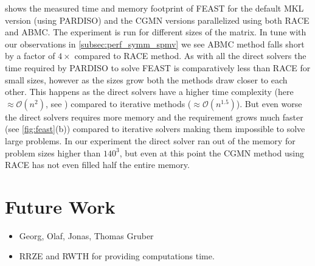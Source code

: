  shows the measured time and memory footprint of FEAST for 
the default MKL version (using PARDISO) and the CGMN versions
 parallelized using both \acrshort{RACE} and \acrshort{ABMC}.
The experiment is run for different sizes of the matrix. In tune
with our observations in \cref{subsec:perf_symm_spmv} we see \acrshort{ABMC}
method falls short by a factor of $4\times$ compared to \acrshort{RACE} method.
As with all the direct solvers the time required by PARDISO to solve FEAST
is comparatively less than \acrshort{RACE} for small sizes, however as the 
sizes grow both the methods draw closer to each other. This happens as the 
direct solvers have a higher time complexity (here $\approx \mathcal{O}(n^{2})$, 
see ) compared to iterative methods ($\approx \mathcal{O}(n^{1.5})$).
But even worse the direct solvers requires more memory and the 
requirement grows much faster (see \cref{fig:feast}(b)) compared to 
iterative solvers making them impossible to solve large problems. 
In our experiment the direct solver ran out of the memory for problem sizes
higher than $140^3$, but even at this point the CGMN method using
\acrshort{RACE} has not even filled half the entire memory.



\section{Future Work}

\begin{acks}
\begin{itemize}
	\item Georg, Olaf, Jonas, Thomas Gruber
	\item RRZE and RWTH for providing computations time.
\end{itemize}
\end{acks}


